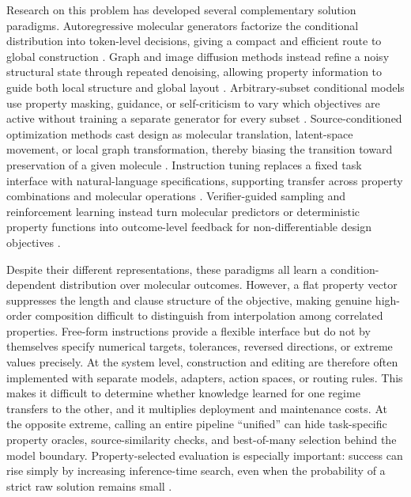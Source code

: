 \documentclass{article}
\begin{document}
Research on this problem has developed several complementary solution
paradigms.  Autoregressive molecular generators factorize the conditional
distribution into token-level decisions, giving a compact and efficient route
to global construction \citep{bagal2022molgpt}.  Graph and image diffusion
methods instead refine a noisy structural state through repeated denoising,
allowing property information to guide both local structure and global layout
\citep{liu2024graphdit,wang2025sketchmol}.  Arbitrary-subset conditional models
use property masking, guidance, or self-criticism to vary which objectives are
active without training a separate generator for every subset
\citep{jolicoeurmartineau2024stggplus}.  Source-conditioned optimization
methods cast design as molecular translation, latent-space movement, or local
graph transformation, thereby biasing the transition toward preservation of a
given molecule \citep{irwin2022chemformer,zhuang2026moleditrl}.  Instruction
tuning replaces a fixed task interface with natural-language specifications,
supporting transfer across property combinations and molecular operations
\citep{dey2025gellm3o,dey2025controllable}.  Verifier-guided sampling and
reinforcement learning instead turn molecular predictors or deterministic
property functions into outcome-level feedback for non-differentiable design
objectives \citep{wang2025sketchmol,gao2026cmoral}.

Despite their different representations, these paradigms all learn a
condition-dependent distribution over molecular outcomes. However, a flat
property vector suppresses the length and clause structure of the objective,
making genuine high-order composition difficult to distinguish from
interpolation among correlated properties.  Free-form instructions provide a
flexible interface but do not by themselves specify numerical targets,
tolerances, reversed directions, or extreme values precisely. At the system
level, construction and editing are therefore often implemented with separate
models, adapters, action spaces, or routing rules. This makes it difficult to
determine whether knowledge learned for one regime transfers to the other, and
it multiplies deployment and maintenance costs. At the opposite extreme,
calling an entire pipeline ``unified'' can hide task-specific property oracles,
source-similarity checks, and best-of-many selection behind the model boundary.
Property-selected evaluation is especially important: success can rise simply
by increasing inference-time search, even when the probability of a strict raw
solution remains small \citep{gao2022sampleefficiency}.
\end{document}
